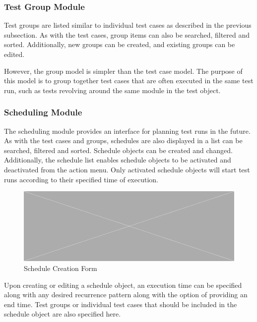 \subsubsection{Test Group Module}

Test groups are listed similar to individual test cases as described in the previous subsection. As with the test cases, group items can also be searched, filtered and sorted. Additionally, new groups can be created, and existing groups can be edited.

However, the group model is simpler than the test case model. The purpose of this model is to group together test cases that are often executed in the same test run, such as tests revolving around the same module in the test object.

\subsubsection{Scheduling Module}

The scheduling module provides an interface for planning test runs in the future. As with the test cases and groups, schedules are also displayed in a list can be searched, filtered and sorted. Schedule objects can be created and changed. Additionally, the schedule list enables schedule objects to be activated and deactivated from the action menu. Only activated schedule objects will start test runs according to their specified time of execution.

\begin{figure}[h]
    \centering
    \includegraphics[width=\textwidth]{figures/placeholder.png}
    \caption{Schedule Creation Form}
    \label{fig.sched_mod}
\end{figure}

Upon creating or editing a schedule object, an execution time can be specified along with any desired recurrence pattern along with the option of providing an end time. Test groups or individual test cases that should be included in the schedule object are also specified here.

